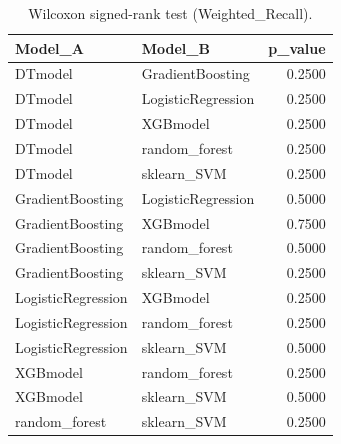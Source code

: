 \begin{table}[t]
\centering
\begin{tabular}{llr}
\toprule
Model_A & Model_B & p_value \\
\midrule
DTmodel & GradientBoosting & 0.2500 \\
DTmodel & LogisticRegression & 0.2500 \\
DTmodel & XGBmodel & 0.2500 \\
DTmodel & random_forest & 0.2500 \\
DTmodel & sklearn_SVM & 0.2500 \\
GradientBoosting & LogisticRegression & 0.5000 \\
GradientBoosting & XGBmodel & 0.7500 \\
GradientBoosting & random_forest & 0.5000 \\
GradientBoosting & sklearn_SVM & 0.2500 \\
LogisticRegression & XGBmodel & 0.2500 \\
LogisticRegression & random_forest & 0.2500 \\
LogisticRegression & sklearn_SVM & 0.5000 \\
XGBmodel & random_forest & 0.2500 \\
XGBmodel & sklearn_SVM & 0.5000 \\
random_forest & sklearn_SVM & 0.2500 \\
\bottomrule
\end{tabular}
\caption{Wilcoxon signed-rank test (Weighted_Recall).}
\label{tab:wilcoxon_Weighted_Recall}
\end{table}